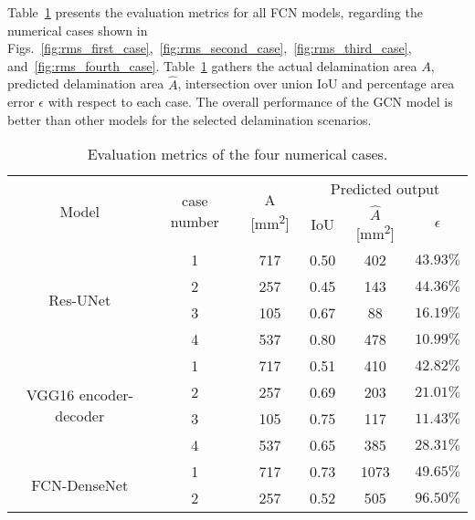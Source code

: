 Table~\ref{tab:RMS_num_cases} presents the evaluation metrics for all FCN models, regarding the numerical cases shown in Figs.~\ref{fig:rms_first_case},~\ref{fig:rms_second_case},~\ref{fig:rms_third_case}, and~\ref{fig:rms_fourth_case}.
Table~\ref{tab:RMS_num_cases} gathers the actual delamination area \(A\), predicted delamination area \(\hat{A}\), intersection over union IoU and percentage area error \(\epsilon\) with respect to each case. 
The overall performance of the GCN model is better than other models for the selected delamination scenarios.
\begin{table}[ht!]
	\centering
	\caption{Evaluation metrics of the four numerical cases.}
	\label{tab:RMS_num_cases}
	\begin{tabular}{cccccc}
		\toprule[1.5pt]
		\multirow{2}{*}{Model} & \multirow{2}{*}{case number} & \multicolumn{1}{c}{\multirow{2}{*}{A [mm\textsuperscript{2}]}} & \multicolumn{3}{c}{Predicted output} \\ 
		\cmidrule(lr){4-6} & & & \multicolumn{1}{c}{IoU} & \multicolumn{1}{c}{\(\hat{A}\) [mm\textsuperscript{2}]} & \(\epsilon\) \\
		\midrule
		\multirow{4}{*}{Res-UNet} 
		& 1 & 717 & \multicolumn{1}{c}{0.50} & \multicolumn{1}{c}{402} & \(43.93\%\) \\ 
		& 2 & 257 & \multicolumn{1}{c}{0.45} & \multicolumn{1}{c}{143} & \(44.36\%\) \\ 
		& 3 & 105 & \multicolumn{1}{c}{0.67} & \multicolumn{1}{c}{88} & \(16.19\%\) \\ 
		& 4 & 537 & \multicolumn{1}{c}{0.80} & \multicolumn{1}{c}{478} & \(10.99\%\) \\ 
		\midrule
		\multirow{4}{*}{VGG16 encoder-decoder} 
		& 1 & 717 & \multicolumn{1}{c}{0.51} & \multicolumn{1}{c}{410} & \(42.82\%\) \\ 
		& 2 & 257 & \multicolumn{1}{c}{0.69} & \multicolumn{1}{c}{203} & \(21.01\%\) \\ 
		& 3 & 105 & \multicolumn{1}{c}{0.75} & \multicolumn{1}{c}{117} & \(11.43\%\) \\ 
		& 4 & 537 & \multicolumn{1}{c}{0.65} & \multicolumn{1}{c}{385} & \(28.31\%\) \\ 
		\midrule
		\multirow{4}{*}{FCN-DenseNet} 
		& 1 & 717 & \multicolumn{1}{c}{0.73} & \multicolumn{1}{c}{1073} & \(49.65\%\) \\ 
		& 2 & 257 & \multicolumn{1}{c}{0.52} & \multicolumn{1}{c}{505} & \(96.50\%\) \\ 

\end{tabular}
\end{table}
